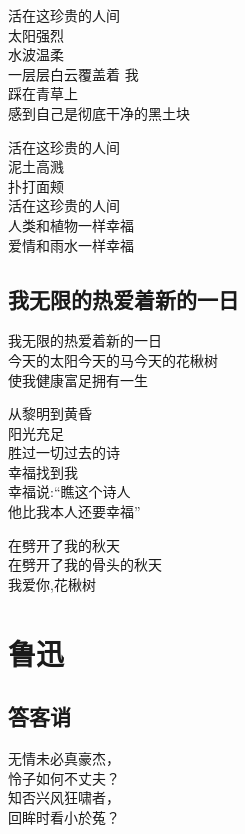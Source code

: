 \documentclass[]{book}
\renewenvironment{quote}{\begin{VF}}{\end{VF}}
\begin{document}
\begin{quote}
活在这珍贵的人间\\
太阳强烈\\
水波温柔\\
一层层白云覆盖着 我\\
踩在青草上\\
感到自己是彻底干净的黑土块

活在这珍贵的人间\\
泥土高溅\\
扑打面颊\\
活在这珍贵的人间\\
人类和植物一样幸福\\
爱情和雨水一样幸福
\end{quote}

\section{我无限的热爱着新的一日}

\begin{quote}
我无限的热爱着新的一日\\
今天的太阳今天的马今天的花楸树\\
使我健康富足拥有一生

从黎明到黄昏\\
阳光充足\\
胜过一切过去的诗\\
幸福找到我\\
幸福说:``瞧这个诗人\\
他比我本人还要幸福''

在劈开了我的秋天\\
在劈开了我的骨头的秋天\\
我爱你,花楸树
\end{quote}

\chapter{鲁迅}

\section{答客诮}

\begin{quote}
无情未必真豪杰，\\
怜子如何不丈夫？\\
知否兴风狂啸者，\\
回眸时看小於菟？
\end{quote}
\end{document}
